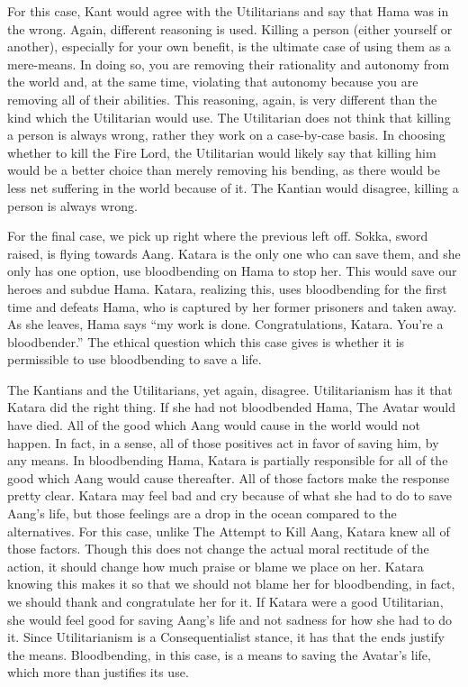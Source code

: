 For this case, Kant would agree with the Utilitarians and say that Hama was in the wrong. Again, different reasoning is used. Killing a person (either yourself or another), especially for your own benefit, is the ultimate case of using them as a mere-means. In doing so, you are removing their rationality and autonomy from the world and, at the same time, violating that autonomy because you are removing all of their abilities. This reasoning, again, is very different than the kind which the Utilitarian would use. The Utilitarian does not think that killing a person is always wrong, rather they work on a case-by-case basis. In choosing whether to kill the Fire Lord, the Utilitarian would likely say that killing him would be a better choice than merely removing his bending, as there would be less net suffering in the world because of it. The Kantian would disagree, killing a person is always wrong.

For the final case, we pick up right where the previous left off. Sokka, sword raised, is flying towards Aang. Katara is the only one who can save them, and she only has one option, use bloodbending on Hama to stop her. This would save our heroes and subdue Hama. Katara, realizing this, uses bloodbending for the first time and defeats Hama, who is captured by her former prisoners and taken away. As she leaves, Hama says “my work is done. Congratulations, Katara. You’re a bloodbender.”\autocite[22:53-23:43]{puppetmaster} The ethical question which this case gives is whether it is permissible to use bloodbending to save a life.

The Kantians and the Utilitarians, yet again, disagree. Utilitarianism has it that Katara did the right thing. If she had not bloodbended Hama, The Avatar would have died. All of the good which Aang would cause in the world would not happen. In fact, in a sense, all of those positives act in favor of saving him, by any means. In bloodbending Hama, Katara is partially responsible for all of the good which Aang would cause thereafter. All of those factors make the response pretty clear. Katara may feel bad and cry because of what she had to do to save Aang’s life, but those feelings are a drop in the ocean compared to the alternatives. For this case, unlike The Attempt to Kill Aang, Katara knew all of those factors. Though this does not change the actual moral rectitude of the action, it should change how much praise or blame we place on her. Katara knowing this makes it so that we should not blame her for bloodbending, in fact, we should thank and congratulate her for it. If Katara were a good Utilitarian, she would feel good for saving Aang’s life and not sadness for how she had to do it. Since Utilitarianism is a Consequentialist stance, it has that the ends justify the means. Bloodbending, in this case, is a means to saving the Avatar’s life, which more than justifies its use.

